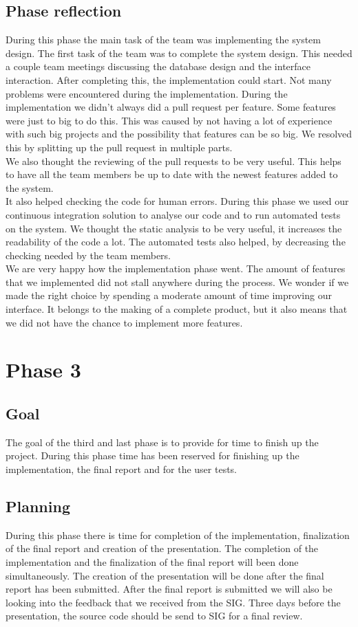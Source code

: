 \subsection{Phase reflection}
During this phase the main task of the team was implementing the system design.
The first task of the team was to complete the system design.
This needed a couple team meetings discussing the database design and the interface interaction.
After completing this, the implementation could start.
Not many problems were encountered during the implementation.
During the implementation we didn't always did a pull request per feature.
Some features were just to big to do this.
This was caused by not having a lot of experience with such big projects and the possibility that features can be so big.
We resolved this by splitting up the pull request in multiple parts.\\
We also thought the reviewing of the pull requests to be very useful.
This helps to have all the team members be up to date with the newest features added to the system.\\
It also helped checking the code for human errors.
During this phase we used our continuous integration solution to analyse our code and to run automated tests on the system.
We thought the static analysis to be very useful, it increases the readability of the code a lot.
The automated tests also helped, by decreasing the checking needed by the team members.\\
We are very happy how the implementation phase went.
The amount of features that we implemented did not stall anywhere during the process.
We wonder if we made the right choice by spending a moderate amount of time improving our interface.
It belongs to the making of a complete product, but it also means that we did not have the chance to implement more features.

\section{Phase 3}
\subsection{Goal}
The goal of the third and last phase is to provide for time to finish up the project.
During this phase time has been reserved for finishing up the implementation, the final report and for the user tests.

\subsection{Planning}
During this phase there is time for completion of the implementation, finalization of the final report and creation of the presentation.
The completion of the implementation and the finalization of the final report will been done simultaneously.
The creation of the presentation will be done after the final report has been submitted.
After the final report is submitted we will also be looking into the feedback that we received from the SIG.
Three days before the presentation, the source code should be send to SIG for a final review.


